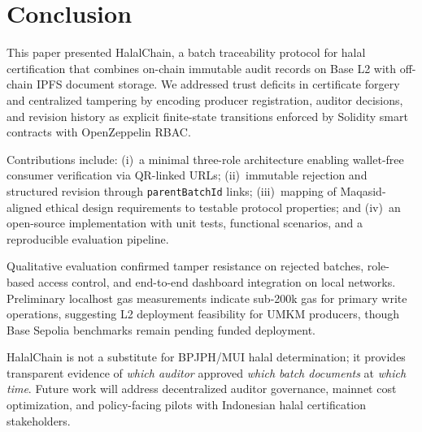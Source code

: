 \section{Conclusion}
\label{sec:conclusion}

This paper presented HalalChain, a batch traceability protocol for halal certification that combines on-chain immutable audit records on Base L2 with off-chain IPFS document storage.
We addressed trust deficits in certificate forgery and centralized tampering by encoding producer registration, auditor decisions, and revision history as explicit finite-state transitions enforced by Solidity smart contracts with OpenZeppelin RBAC.

Contributions include: (i)~a minimal three-role architecture enabling wallet-free consumer verification via QR-linked URLs; (ii)~immutable rejection and structured revision through \texttt{parentBatchId} links; (iii)~mapping of Maqasid-aligned ethical design requirements to testable protocol properties; and (iv)~an open-source implementation with unit tests, functional scenarios, and a reproducible evaluation pipeline.

Qualitative evaluation confirmed tamper resistance on rejected batches, role-based access control, and end-to-end dashboard integration on local networks.
Preliminary localhost gas measurements indicate sub-200k gas for primary write operations, suggesting L2 deployment feasibility for UMKM producers, though Base Sepolia benchmarks remain pending funded deployment.

HalalChain is not a substitute for BPJPH/MUI halal determination; it provides transparent evidence of \emph{which auditor} approved \emph{which batch documents} at \emph{which time}.
Future work will address decentralized auditor governance, mainnet cost optimization, and policy-facing pilots with Indonesian halal certification stakeholders.
